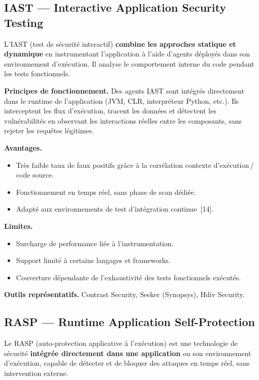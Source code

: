 \subsection{IAST --- Interactive Application Security Testing}

L'IAST (test de sécurité interactif) \textbf{combine les approches statique et
dynamique} en instrumentant l'application à l'aide d'agents déployés dans son
environnement d'exécution. Il analyse le comportement interne du code pendant
les tests fonctionnels.

\textbf{Principes de fonctionnement.} Des agents IAST sont intégrés directement
dans le runtime de l'application (JVM, CLR, interpréteur Python, etc.). Ils
interceptent les flux d'exécution, tracent les données et détectent les
vulnérabilités en observant les interactions réelles entre les composants, sans
rejeter les requêtes légitimes.

\textbf{Avantages.}
\begin{itemize}[leftmargin=*, topsep=2pt, itemsep=1pt]
  \item Très faible taux de faux positifs grâce à la corrélation contexte
    d'exécution\,/\,code source.
  \item Fonctionnement en temps réel, sans phase de scan dédiée.
  \item Adapté aux environnements de test d'intégration continue~[14].
\end{itemize}

\textbf{Limites.}
\begin{itemize}[leftmargin=*, topsep=2pt, itemsep=1pt]
  \item Surcharge de performance liée à l'instrumentation.
  \item Support limité à certains langages et frameworks.
  \item Couverture dépendante de l'exhaustivité des tests fonctionnels exécutés.
\end{itemize}

\textbf{Outils représentatifs.} Contrast Security, Seeker (Synopsys), Hdiv
Security.

\subsection{RASP --- Runtime Application Self-Protection}

Le RASP (auto-protection applicative à l'exécution) est une technologie de
sécurité \textbf{intégrée directement dans une application} ou son environnement
d'exécution, capable de détecter et de bloquer des attaques en temps réel, sans
intervention externe.

